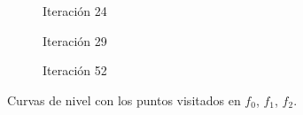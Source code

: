 \begin{figure}[h!]
     \centering
     \begin{subfigure}[b]{0.45\textwidth}
         \centering
         
         \caption{Iteración 24}
         \label{fig:curvas-adagrad-f0}
     \end{subfigure}
     \hfill
     \begin{subfigure}[b]{0.45\textwidth}
         \centering
         
         \caption{Iteración 29}
         \label{fig:curvas-adagrad-f1}
     \end{subfigure}
     \hfill
     \begin{subfigure}[b]{0.45\textwidth}
         \centering
         
         \caption{Iteración 52}
         \label{fig:curvas-adagrad-f2}
     \end{subfigure}
        \caption{Curvas de nivel con los puntos visitados en $f_0$, $f_1$, $f_2$.}
        \label{fig:curvas-adagrad}
\end{figure}

\newpage

